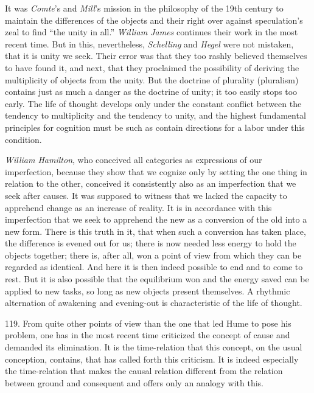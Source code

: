 \documentclass[12pt,a4paper]{book}
\newcommand{\opage}[1]{\marginnote{\footnotesize\textit{[#1]}}}
\begin{document}
It was \emph{Comte}'s and \emph{Mill}'s mission in the philosophy of the 19th
century to maintain the differences of the objects and their right over against
speculation's zeal to find ``the unity in all.'' \emph{William James} continues
their \opage{282}work in the most recent time. But in this, nevertheless, \emph{Schelling}
and \emph{Hegel} were not mistaken, that it is unity we seek. Their error was
that they too rashly believed themselves to have found it, and next, that they
proclaimed the possibility of deriving the multiplicity of objects from the
unity. But the doctrine of plurality (pluralism) contains just as much a danger
as the doctrine of unity; it too easily stops too early. The life of thought
develops only under the constant conflict between the tendency to multiplicity
and the tendency to unity, and the highest fundamental principles for cognition
must be such as contain directions for a labor under this condition.

\emph{William Hamilton}, who conceived all categories as expressions of our
imperfection, because they show that we cognize only by setting the one thing in
relation to the other, conceived it consistently also as an imperfection that we
seek after causes. It was supposed to witness that we lacked the capacity to
apprehend change as an increase of reality. It is in accordance with this
imperfection that we seek to apprehend the new as a conversion of the old into a
new form. There is this truth in it, that when such a conversion has taken
place, the difference is evened out for us; there is now needed less energy to
hold the objects together; there is, after all, won a point of view from which
they can be regarded as identical. And here it is then indeed possible to end
and to come to rest. But it is also possible that the equilibrium won and the
energy saved can be applied to new tasks, so long as new objects present
themselves. A rhythmic alternation of awakening and evening-out is
characteristic of the life of thought.

119. From quite other points of view than the one that led Hume to pose his
problem, one has in the most recent time criticized the concept of cause and
demanded its elimination. It is the time-relation that this concept, on the
usual conception, contains, that has called forth this criticism. It is indeed
especially the time-relation that makes the causal relation different from the
relation between ground and consequent and offers only an analogy with this.
\end{document}

